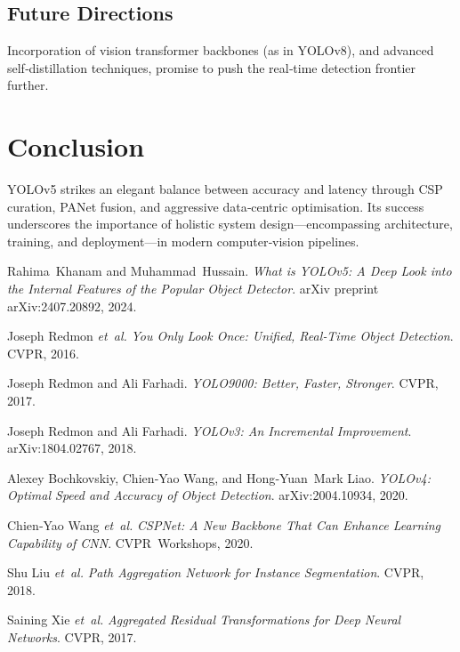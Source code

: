 \documentclass[12pt,a4paper]{article}
\begin{document}
\subsection{Future Directions}
Incorporation of vision transformer backbones (as in YOLOv8), and advanced self‑distillation techniques, promise to push the real‑time detection frontier further.

\section*{Conclusion}
YOLOv5 strikes an elegant balance between accuracy and latency through CSP curation, PANet fusion, and aggressive data‑centric optimisation. Its success underscores the importance of holistic system design—encompassing architecture, training, and deployment—in modern computer‑vision pipelines.


\begin{thebibliography}{99}
    Rahima~Khanam and Muhammad~Hussain.
    \newblock \emph{What is YOLOv5: A Deep Look into the Internal Features of the Popular Object Detector}.
    \newblock arXiv preprint arXiv:2407.20892, 2024.

    Joseph Redmon \emph{et al.}
    \newblock \emph{You Only Look Once: Unified, Real‑Time Object Detection}.
    \newblock CVPR, 2016.

    Joseph Redmon and Ali Farhadi.
    \newblock \emph{YOLO9000: Better, Faster, Stronger}.
    \newblock CVPR, 2017.

    Joseph Redmon and Ali Farhadi.
    \newblock \emph{YOLOv3: An Incremental Improvement}.
    \newblock arXiv:1804.02767, 2018.

    Alexey Bochkovskiy, Chien‑Yao Wang, and Hong‑Yuan Mark Liao.
    \newblock \emph{YOLOv4: Optimal Speed and Accuracy of Object Detection}.
    \newblock arXiv:2004.10934, 2020.

    Chien‑Yao Wang \emph{et al.}
    \newblock \emph{CSPNet: A New Backbone That Can Enhance Learning Capability of CNN}.
    \newblock CVPR Workshops, 2020.

    Shu Liu \emph{et al.}
    \newblock \emph{Path Aggregation Network for Instance Segmentation}.
    \newblock CVPR, 2018.

    Saining Xie \emph{et al.}
    \newblock \emph{Aggregated Residual Transformations for Deep Neural Networks}.
    \newblock CVPR, 2017.
\end{thebibliography}
\end{document}
